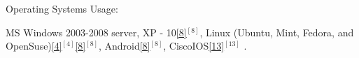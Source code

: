 \begin{cventries}
%    
%    
  \cventry
    {Operating Systems Usage:} %
    {} 
    {} 
    {} 
    {
      \begin{cvitems} %
        \item {
        MS Windows 2003-2008 server, XP - 10\ref{8}{$^{[8]}$}, 
        Linux (Ubuntu, Mint, Fedora, and OpenSuse)\ref{4}{$^{[4]}$}\ref{8}{$^{[8]}$}, 
        Android\ref{8}{$^{[8]}$}, 
        CiscoIOS\ref{13}{$^{[13]}$}%
        .} 
      \end{cvitems}
    }  
  \vspace{-0.4cm} 
    



\end{cventries}
